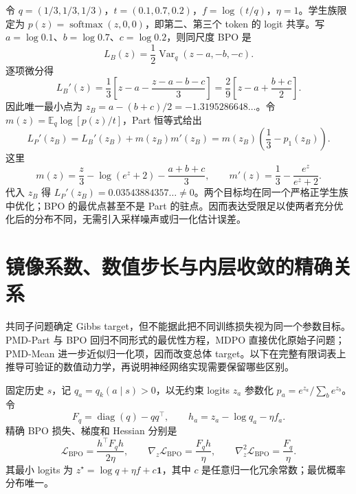 \documentclass[lang=cn,scheme=chinese,openany]{../book/elegantbook}
\newcommand{\E}{\mathbb E}
\newcommand{\Var}{\operatorname{Var}}
\begin{document}
\begin{example}
令 $q=(1/3,1/3,1/3)$，$t=(0.1,0.7,0.2)$，$f=\log(t/q)$，$\eta=1$。学生族限定为 $p(z)=\operatorname{softmax}(z,0,0)$，即第二、第三个 token 的 logit 共享。写 $a=\log0.1$、$b=\log0.7$、$c=\log0.2$，则同尺度 BPO 是
\begin{equation}
L_B(z)=\frac12\Var_q(z-a,-b,-c).
\end{equation}
逐项微分得
\begin{equation}
L_B'(z)=\frac13\left[z-a-\frac{z-a-b-c}{3}\right]
=\frac29\left[z-a+\frac{b+c}{2}\right].
\end{equation}
因此唯一最小点为 $z_B=a-(b+c)/2=-1.3195286648\ldots$。令 $m(z)=\E_q\log[p(z)/t]$，Part 恒等式给出
\begin{equation}
L_P'(z_B)=L_B'(z_B)+m(z_B)m'(z_B)
=m(z_B)\left(\frac13-p_1(z_B)\right).
\end{equation}
这里
\begin{equation}
m(z)=\frac z3-\log(e^z+2)-\frac{a+b+c}{3},\qquad
m'(z)=\frac13-\frac{e^z}{e^z+2}.
\end{equation}
代入 $z_B$ 得 $L_P'(z_B)=0.03543884357\ldots\ne0$。两个目标均在同一个严格正学生族中优化；BPO 的最优点甚至不是 Part 的驻点。因而表达受限足以使两者充分优化后的分布不同，无需引入采样噪声或归一化估计误差。
\end{example}



\section{镜像系数、数值步长与内层收敛的精确关系}
\label{sec:ch2-eta-step-audit}

共同子问题确定 Gibbs target，但不能据此把不同训练损失视为同一个参数目标。PMD-Part 与 BPO 回归不同形式的最优性方程，MDPO 直接优化原始子问题；PMD-Mean 进一步近似归一化项，因而改变总体 target。以下在完整有限词表上推导可验证的数值动力学，再说明神经网络实现需要保留哪些区别。

\begin{proposition}
\label{prop:ch2-bpo-logit-quadratic}
固定历史 $s$，记 $q_a= q_k(a\mid s)>0$，以无约束 logits $z_a$ 参数化 $p_a=e^{z_a}/\sum_b e^{z_b}$。令
\begin{equation*}
 F_q=\operatorname{diag}(q)-qq^\top,\qquad
 h_a=z_a-\log q_a-\eta f_a.
\end{equation*}
精确 BPO 损失、梯度和 Hessian 分别是
\begin{equation}
 \mathcal L_{\mathrm{BPO}}=\frac{h^\top F_qh}{2\eta},\qquad
 \nabla_z\mathcal L_{\mathrm{BPO}}=\frac{F_qh}{\eta},\qquad
 \nabla_z^2\mathcal L_{\mathrm{BPO}}=\frac{F_q}{\eta}.
 \label{eq:ch2-bpo-logit-quadratic}
\end{equation}
其最小 logits 为 $z^\star=\log q+\eta f+c\mathbf1$，其中 $c$ 是任意归一化冗余常数；最优概率分布唯一。
\end{proposition}
\end{document}
